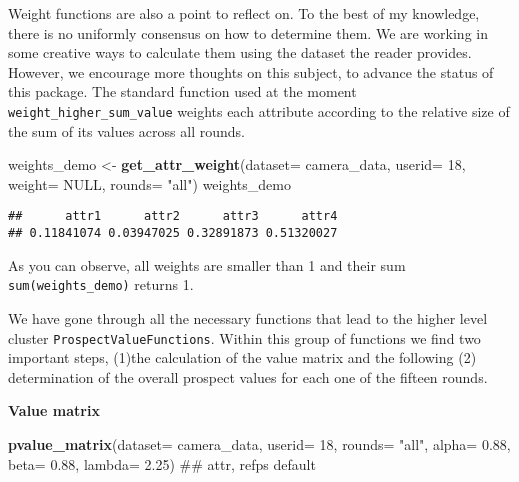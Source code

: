 \documentclass[]{article}
\newenvironment{Shaded}{\begin{snugshade}}{\end{snugshade}}
\newcommand{\KeywordTok}[1]{\textcolor[rgb]{0.13,0.29,0.53}{\textbf{{#1}}}}
\newcommand{\DataTypeTok}[1]{\textcolor[rgb]{0.13,0.29,0.53}{{#1}}}
\newcommand{\DecValTok}[1]{\textcolor[rgb]{0.00,0.00,0.81}{{#1}}}
\newcommand{\FloatTok}[1]{\textcolor[rgb]{0.00,0.00,0.81}{{#1}}}
\newcommand{\StringTok}[1]{\textcolor[rgb]{0.31,0.60,0.02}{{#1}}}
\newcommand{\OtherTok}[1]{\textcolor[rgb]{0.56,0.35,0.01}{{#1}}}
\newcommand{\NormalTok}[1]{{#1}}
\begin{document}
Weight functions are also a point to reflect on. To the best of my
knowledge, there is no uniformly consensus on how to determine them. We
are working in some creative ways to calculate them using the dataset
the reader provides. However, we encourage more thoughts on this
subject, to advance the status of this package. The standard function
used at the moment \texttt{weight\_higher\_sum\_value} weights each
attribute according to the relative size of the sum of its values across
all rounds.

\begin{Shaded}
\begin{Highlighting}[]
\NormalTok{weights_demo <-}\StringTok{ }\KeywordTok{get_attr_weight}\NormalTok{(}\DataTypeTok{dataset=} \NormalTok{camera_data, }\DataTypeTok{userid=} \DecValTok{18}\NormalTok{,}
                \DataTypeTok{weight=} \OtherTok{NULL}\NormalTok{,}
                \DataTypeTok{rounds=} \StringTok{"all"}\NormalTok{)}
\NormalTok{weights_demo}
\end{Highlighting}
\end{Shaded}

\begin{verbatim}
##      attr1      attr2      attr3      attr4 
## 0.11841074 0.03947025 0.32891873 0.51320027
\end{verbatim}

As you can observe, all weights are smaller than 1 and their sum
\texttt{sum(weights\_demo)} returns 1.

We have gone through all the necessary functions that lead to the higher
level cluster \texttt{ProspectValueFunctions}. Within this group of
functions we find two important steps, (1)the calculation of the value
matrix and the following (2) determination of the overall prospect
values for each one of the fifteen rounds.

\textbf{Value matrix}

\begin{Shaded}
\begin{Highlighting}[]
\KeywordTok{pvalue_matrix}\NormalTok{(}\DataTypeTok{dataset=} \NormalTok{camera_data, }\DataTypeTok{userid=} \DecValTok{18}\NormalTok{,}
                \DataTypeTok{rounds=} \StringTok{"all"}\NormalTok{,}
                \DataTypeTok{alpha=} \FloatTok{0.88}\NormalTok{, }\DataTypeTok{beta=} \FloatTok{0.88}\NormalTok{, }\DataTypeTok{lambda=} \FloatTok{2.25}\NormalTok{)  ## attr, refps default}
\end{Highlighting}
\end{Shaded}
\end{document}
